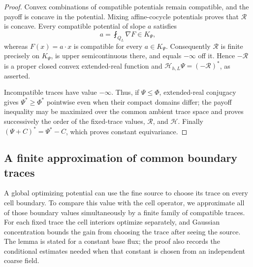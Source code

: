\documentclass{smfart}
\theoremstyle{definition}
\newcommand{\1}{\mathbf 1}
\begin{document}
\begin{proof}
Convex combinations of compatible potentials remain compatible, and
the payoff is concave in the potential.  Mixing affine-cocycle
potentials proves that $\mathcal R$ is concave.  Every compatible potential of
slope $a$ satisfies
\begin{equation*}
a=\fint_ {Q_ L}\nabla F\in K_ \Psi,
\end{equation*}
whereas $F(x)=a\cdot x$ is compatible for every $a\in K_ \Psi$.
Consequently $\mathcal R$ is finite precisely on $K_ \Psi$, is
upper semicontinuous there, and equals $-\infty$ off it.  Hence
$-\mathcal R$ is a proper closed convex extended-real function and
$\mathcal H_ {h,L}\Psi=(-\mathcal R)^*$, as asserted.

Incompatible traces have value $-\infty$.  Thus, if
$\Psi\leq\Phi$, extended-real conjugacy gives
$\Psi^*\geq\Phi^*$ pointwise even when their compact domains differ;
the payoff inequality may be maximized over the common ambient trace
space and proves successively the order of the fixed-trace values,
$\mathcal R$, and $\mathcal H$.  Finally
$(\Psi+C)^*=\Psi^*-C$, which proves constant equivariance.

\end{proof}

\subsection{A finite approximation of common boundary traces}

A global optimizing potential can use the fine source to choose its trace
on every cell boundary.  To compare this value with the cell operator,
we approximate all of those boundary values simultaneously by a finite
family of compatible traces.  For each fixed trace the cell interiors
optimize separately, and Gaussian concentration bounds the gain from
choosing the trace after seeing the source.  The lemma is stated for a
constant base flux; the proof also records the conditional estimates
needed when that constant is chosen from an independent coarse field.
\end{document}
